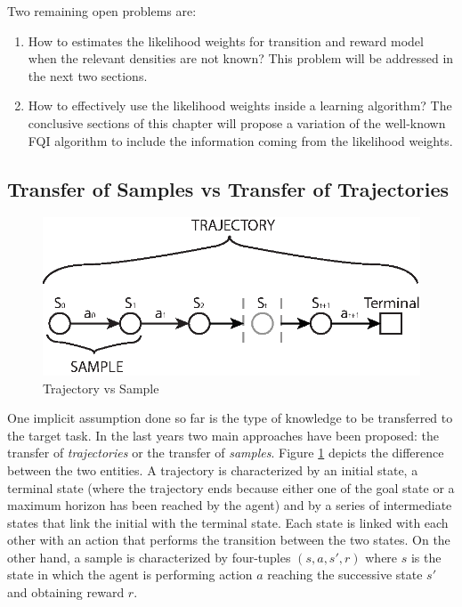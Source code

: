   \noindent Two remaining open problems are:
  \begin{enumerate}
    \item How to estimates the likelihood weights for transition and reward model when the relevant densities are not known? This
    problem will be addressed in the next two sections.
    \item How to effectively use the likelihood weights inside a learning algorithm? The conclusive sections of this chapter will propose a variation
    of the well-known FQI algorithm to include the information coming from the likelihood weights.
  \end{enumerate}

\subsection{Transfer of Samples vs Transfer of Trajectories}
  \begin{figure}
    \centering
    \includegraphics{images/trajectorysample.eps}
    \caption{Trajectory vs Sample}
    \label{trajectorysample}
  \end{figure}

  \noindent One implicit assumption done so far is the type of knowledge to be transferred to the target task.
  In the last years two main approaches have been proposed: the transfer of \textit{trajectories} or the transfer
  of \textit{samples}. Figure \ref{trajectorysample} depicts the difference between the two entities.\newline
  A trajectory is characterized by an initial state, a terminal state (where the trajectory ends because either
  one of the goal state or a maximum horizon has been reached by the agent) and by a series of intermediate states
  that link the initial with the terminal state. Each state is linked with each other with an action that performs
  the transition between the two states. On the other hand, a sample is characterized by four-tuples $(s,a,s',r)$
  where $s$ is the state in which the agent is performing action $a$ reaching the successive state $s'$ and
  obtaining reward $r$.\newline


